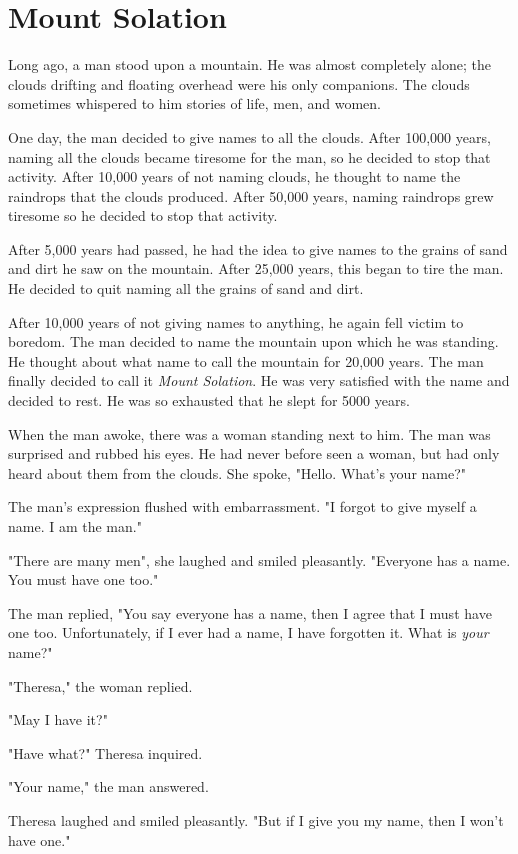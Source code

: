 \chapter{Mount Solation}

Long ago, a man stood upon a mountain. He was almost completely alone; the clouds drifting and floating overhead were his only companions. The clouds sometimes whispered to him stories of life, men, and women.

One day, the man decided to give names to all the clouds. After 100,000 years, naming all the clouds became tiresome for the man, so he decided to stop that activity. After 10,000 years of not naming clouds, he thought to name the raindrops that the clouds produced. After 50,000 years, naming raindrops grew tiresome so he decided to stop that activity.

After 5,000 years had passed, he had the idea to give names to the grains of sand and dirt he saw on the mountain. After 25,000 years, this began to tire the man. He decided to quit naming all the grains of sand and dirt.

After 10,000 years of not giving names to anything, he again fell victim to boredom. The man decided to name the mountain upon which he was standing. He thought about what name to call the mountain for 20,000 years. The man finally decided to call it \textit{Mount Solation}. He was very satisfied with the name and decided to rest. He was so exhausted that he slept for 5000 years.

When the man awoke, there was a woman standing next to him. The man was surprised and rubbed his eyes. He had never before seen a woman, but had only heard about them from the clouds. She spoke, "Hello. What's your name?"

The man's expression flushed with embarrassment. "I forgot to give myself a name. I am the man."

"There are many men", she laughed and smiled pleasantly. "Everyone has a name. You must have one too."

The man replied, "You say everyone has a name, then I agree that I must have one too. Unfortunately, if I ever had a name, I have forgotten it. What is \textit{your} name?"

"Theresa," the woman replied.

"May I have it?"

"Have what?" Theresa inquired.

"Your name," the man answered.

Theresa laughed and smiled pleasantly. "But if I give you my name, then I won't have one."

